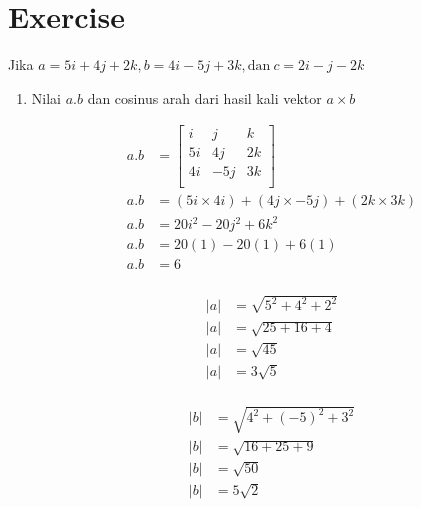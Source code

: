 \documentclass[12pt,titlepage]{article}
\begin{document}
\section{Exercise}
Jika $a = 5i + 4j + 2k, b = 4i - 5j + 3k, \text{dan}~c = 2i - j - 2k$
\begin{enumerate}
    \item {
        Nilai $a.b$ dan cosinus arah dari hasil kali vektor $a \times b$

        \begin{align*}
            a.b &= \left[\begin{matrix}
                i  &  j &  k \\
                5i & 4j & 2k \\
                4i & -5j & 3k \\
            \end{matrix}\right]\\
            a.b &= (5i \times 4i) + (4j \times -5j) + (2k \times 3k) \\
            a.b &= 20i^2 - 20j^2 + 6k^2 \\
            a.b &= 20(1) - 20(1) + 6(1) \\
            a.b &= 6 \\
        \end{align*}

        \begin{align*}
            |a| &= \sqrt{5^2 + 4^2 + 2^2} \\
            |a| &= \sqrt{25 + 16 + 4} \\
            |a| &= \sqrt{45} \\
            |a| &= 3\sqrt{5} \\
        \end{align*}

        \begin{align*}
            |b| &= \sqrt{4^2 + (-5)^2 + 3^2} \\
            |b| &= \sqrt{16 + 25 + 9} \\
            |b| &= \sqrt{50} \\
            |b| &= 5\sqrt{2} \\
        \end{align*}

}
\end{enumerate}
\end{document}
